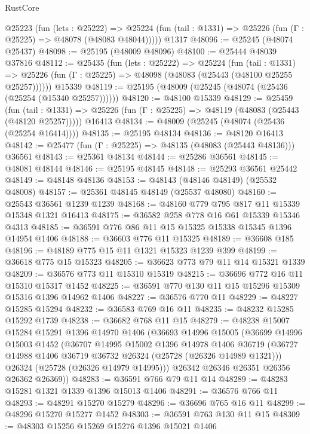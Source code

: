 \begin{lexlean}{RustCore}
\begin{coremodule}
    @25223
      (fun (lets : @25222) =>
      @25224 (fun (tail : @1331) => @25226 (fun (Γ : @25225) => @48078 (@48083 @48044)))))
    @1317
@48096 := @25245 (@48074 @25437)
@48098 := @25195 (@48009 @48096)
@48100 := @25444 @48039 @37816
@48112 := @25435
    (fun (lets : @25222) =>
    @25224
      (fun (tail : @1331) =>
      @25226 (fun (Γ : @25225) => @48098 (@48083 (@25443 (@48100 @25255 @25257))))))
    @15339
@48119 := @25195 (@48009 (@25245 (@48074 (@25436 (@25254 (@15340 @25257))))))
@48120 := @48100 @15339
@48129 := @25459
    (fun (tail : @1331) => @25226 (fun (Γ : @25225) => @48119 (@48083 (@25443 (@48120 @25257)))))
    @16413
@48134 := @48009 (@25245 (@48074 (@25436 (@25254 @16414))))
@48135 := @25195 @48134
@48136 := @48120 @16413
@48142 := @25477 (fun (Γ : @25225) => @48135 (@48083 (@25443 @48136))) @36561
@48143 := @25361 @48134
@48144 := @25286 @36561
@48145 := @48081 @48144
@48146 := @25195 @48145
@48148 := @25293 @36561 @25442
@48149 := @48148 @48136
@48153 := @48143 (@48146 @48149) (@25532 @48008)
@48157 := @25361 @48145 @48149 (@25537 @48080)
@48160 := @25543 @36561 @1239 @1239
@48168 := @48160 @779 @795 @817 @11 @15339 @15348 @1321 @16413
@48175 := @36582 @258 @778 @16 @61 @15339 @15346 @4313
@48185 := @36591 @776 @86 @11 @15 @15325 @15338 @15345 @1396 @14954 @1406
@48188 := @36603 @776 @11 @15325
@48189 := @36608 @185
@48196 := @48189 @775 @15 @11 @1321 @15323 @1239 @399
@48199 := @36618 @775 @15 @15323
@48205 := @36623 @773 @79 @11 @14 @15321 @1339
@48209 := @36576 @773 @11 @15310 @15319
@48215 := @36696 @772 @16 @11 @15310 @15317 @1452
@48225 := @36591 @770 @130 @11 @15 @15296 @15309 @15316 @1396 @14962 @1406
@48227 := @36576 @770 @11
@48229 := @48227 @15285 @15294
@48232 := @36583 @769 @16 @11
@48235 := @48232 @15285 @15292 @1739
@48238 := @36682 @768 @11 @15
@48279 := @48238
    @15007
    @15284
    @15291
    @1396
    @14970
    @1406
    (@36693
      @14996
      @15005
      (@36699
        @14996
        @15003
        @1452
        (@36707
          @14995
          @15002
          @1396
          @14978
          @1406
          @36719
          (@36727 @14988 @1406 @36719 @36732 @26324 (@25728 (@26326 @14989 @1321)))
          @26324
          (@25728 (@26326 @14979 @14995)))
        @26342
        @26346
        @26351
        @26356
        @26362
        @26369))
@48283 := @36591 @766 @79 @11 @14
@48289 := @48283 @15281 @1321 @1339 @1396 @15013 @1406
@48291 := @36576 @766 @11
@48293 := @48291 @15270 @15279
@48296 := @36696 @765 @16 @11
@48299 := @48296 @15270 @15277 @1452
@48303 := @36591 @763 @130 @11 @15
@48309 := @48303 @15256 @15269 @15276 @1396 @15021 @1406

\end{coremodule}
\end{lexlean}

